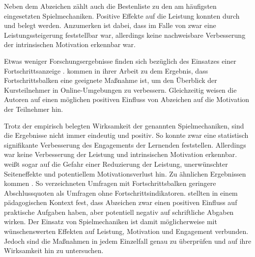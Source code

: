 \documentclass[
    a4paper,
    doc,
    12pt,
    natbib,
]{apa6}
\begin{document}
Neben dem Abzeichen zählt auch die Bestenliste zu den am häufigsten eingesetzten Spielmechaniken. Positive Effekte auf die Leistung konnten durch \cite{brauer_badges_2019} und \cite{mekler_points_2013} belegt werden.
Anzumerken ist dabei, dass im Falle von \cite{mekler_points_2013} zwar eine Leistungssteigerung feststellbar war, allerdings keine nachweisbare Verbesserung der intrinsischen Motivation erkennbar war.

Etwas weniger Forschungsergebnisse finden sich bezüglich des Einsatzes einer Fortschrittsanzeige \citep{koivisto_rise_2019}.
\cite{olsson_visualisation_2016} kommen in ihrer Arbeit zu dem Ergebnis, dass Fortschrittsbalken eine geeignete Maßnahme ist, um den Überblick der Kursteilnehmer in Online-Umgebungen zu verbessern. Gleichzeitig weisen die Autoren auf einen möglichen positiven Einfluss von Abzeichen auf die Motivation der Teilnehmer hin.

Trotz der empirisch belegten Wirksamkeit der genannten Spielmechaniken, sind die Ergebnisse nicht immer eindeutig und positiv.
So konnte \cite{ortiz_gamification_2017} zwar eine statistisch signifikante Verbesserung des Engagements der Lernenden feststellen.
Allerdings war keine Verbesserung der Leistung und intrinsischen Motivation erkennbar.
\cite{toda_dark_2018} weißt sogar auf die Gefahr einer Reduzierung der Leistung, unerwünschter Seiteneffekte und potentiellem Motivationsverlust hin.
Zu ähnlichen Ergebnissen kommen \cite{liu_examining_2017}.
So verzeichneten Umfragen mit Fortschrittsbalken geringere Abschlussquoten als Umfragen ohne Fortschrittsindikatoren. \cite{dominguez_gamifying_2013} stellten in einem pädagogischen Kontext fest, dass Abzeichen zwar einen positiven Einfluss auf praktische Aufgaben haben, aber potentiell negativ auf schriftliche Abgaben wirken. Der Einsatz von Spielmechaniken ist damit möglicherweise mit wünschenswerten Effekten auf Leistung, Motivation und Engagement verbunden. Jedoch sind die Maßnahmen in jedem Einzelfall genau zu überprüfen und auf ihre Wirksamkeit hin zu untersuchen.




\end{document}
